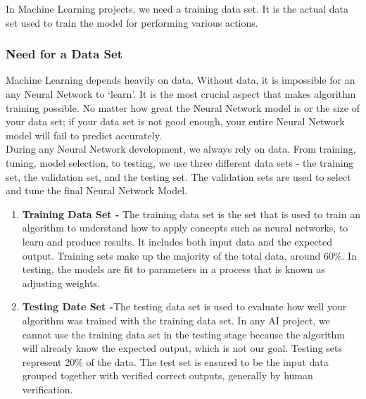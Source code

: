 \documentclass[14pt]{report}
\begin{document}
					In Machine Learning projects, we need a training data set. It is the actual data set used to train the model for performing various actions.

					\subsubsection{Need for a Data Set}
						Machine Learning depends heavily on data. Without data, it is impossible for an any Neural Network to `learn'. It is the most crucial aspect that makes algorithm training possible. No matter how great the Neural Network model is or the size of your data set; if your data set is not good enough, your entire Neural Network model will fail to predict accurately.\\

						During any Neural Network development, we always rely on data. From training, tuning, model selection, to testing, we use three different data sets - the training set, the validation set, and the testing set. The validation sets are used to select and tune the final Neural Network Model.\\
						\begin{enumerate}
							\item \textbf{Training Data Set - }The training data set is the set that is used to train an algorithm to understand how to apply concepts such as neural networks, to learn and produce results. It includes both input data and the expected output. Training sets make up the majority of the total data, around 60\%. In testing, the models are fit to parameters in a process that is known as adjusting weights.
							\item \textbf{Testing Date Set -}The testing data set is used to evaluate how well your algorithm was trained with the training data set. In any AI project, we cannot use the training data set in the testing stage because the algorithm will already know the expected output, which is not our goal. Testing sets represent 20\% of the data. The test set is ensured to be the input data grouped together with verified correct outputs, generally by human verification.
						\end{enumerate}
\end{document}

